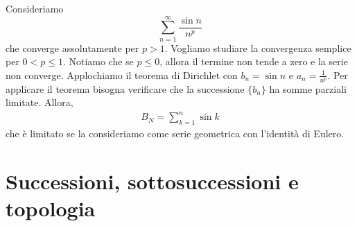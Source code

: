\documentclass[a4paper]{article}
\begin{document}
Consideriamo
\[
    \sum_{n=1}^\infty \frac{\sin n}{n^p}
\]
che converge assolutamente per \(p>1\).
Vogliamo studiare la convergenza semplice per \(0 < p \leq 1\).
Notiamo che se \(p \leq 0\), allora il termine non tende a zero e la serie non converge.
Applochiamo il teorema di Dirichlet con \(b_n = \sin n\) e \(a_n = \frac{1}{n^p}\).
Per applicare il teorema bisogna verificare che la successione \(\{b_n\}\) ha somme parziali limitate.
Allora,
\begin{align*}
    B_N = \sum_{k=1}^n \sin k
\end{align*}
che è limitato se la consideriamo come serie geometrica con l'identità di Eulero.

\pagebreak

\section{Successioni, sottosuccessioni e topologia}

\end{document}
